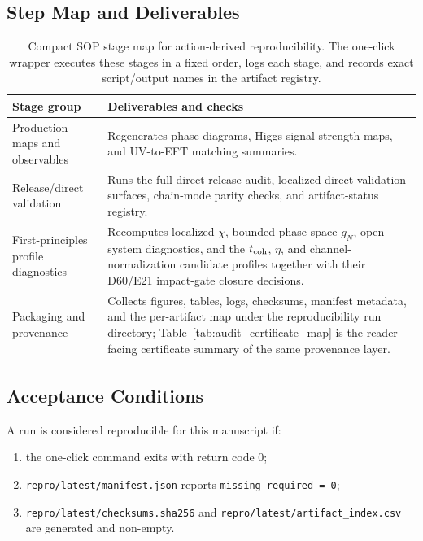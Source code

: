 \documentclass[aps,prd,onecolumn,notitlepage,nofootinbib,superscriptaddress,11pt,floatfix]{revtex4-2}
\begin{document}
\subsection{Step Map and Deliverables}
\begin{table}[t]
\centering
\caption{Compact SOP stage map for action-derived reproducibility. The one-click wrapper executes these stages in a fixed order, logs each stage, and records exact script/output names in the artifact registry.}
\label{tab:repro_sop}
\small
\setlength{\tabcolsep}{5pt}
\begin{tabular}{@{}l l@{}}
\hline\hline
Stage group & Deliverables and checks \\
\hline
\parbox[t]{0.24\textwidth}{Production maps and observables} & \parbox[t]{0.62\textwidth}{Regenerates phase diagrams, Higgs signal-strength maps, and UV-to-EFT matching summaries.} \\
\parbox[t]{0.24\textwidth}{Release/direct validation} & \parbox[t]{0.62\textwidth}{Runs the full-direct release audit, localized-direct validation surfaces, chain-mode parity checks, and artifact-status registry.} \\
\parbox[t]{0.24\textwidth}{First-principles profile diagnostics} & \parbox[t]{0.62\textwidth}{Recomputes localized $\chi$, bounded phase-space $g_N$, open-system diagnostics, and the $t_{\rm coh}$, $\eta$, and channel-normalization candidate profiles together with their D60/E21 impact-gate closure decisions.} \\
\parbox[t]{0.24\textwidth}{Packaging and provenance} & \parbox[t]{0.62\textwidth}{Collects figures, tables, logs, checksums, manifest metadata, and the per-artifact map under the reproducibility run directory; Table~\ref{tab:audit_certificate_map} is the reader-facing certificate summary of the same provenance layer.} \\
\hline\hline
\end{tabular}
\end{table}

\subsection{Acceptance Conditions}
A run is considered reproducible for this manuscript if:
\begin{enumerate}
    \item the one-click command exits with return code 0;
    \item \texttt{repro/latest/manifest.json} reports \texttt{missing\_required = 0};
    \item \texttt{repro/latest/checksums.sha256} and \texttt{repro/latest/artifact\_index.csv} are generated and non-empty.
\end{enumerate}
\end{document}
